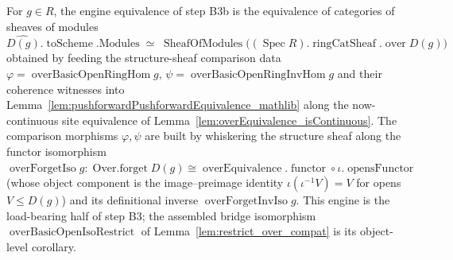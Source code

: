 \begin{definition}
  \label{def:modules_over_basicOpen_equivalence}
  For \(g \in R\), the engine equivalence of step B3b is the equivalence of categories of sheaves of
  modules
  \[
    \widehat{D(g)}.\operatorname{toScheme}.\mathrm{Modules} \;\simeq\;
    \operatorname{SheafOfModules}\bigl((\operatorname{Spec} R).\operatorname{ringCatSheaf}.\operatorname{over} D(g)\bigr)
  \]
  obtained by feeding the structure-sheaf comparison data
  \(\varphi = \operatorname{overBasicOpenRingHom} g\),
  \(\psi = \operatorname{overBasicOpenRingInvHom} g\) and their coherence witnesses into
  Lemma~\ref{lem:pushforwardPushforwardEquivalence_mathlib} along the now-continuous site equivalence
  of Lemma~\ref{lem:overEquivalence_isContinuous}. The comparison morphisms \(\varphi, \psi\) are built
  by whiskering the structure sheaf along the functor isomorphism
  \(\operatorname{overForgetIso} g : \operatorname{Over.forget} D(g) \cong
  \operatorname{overEquivalence}.\operatorname{functor} \circ \iota.\operatorname{opensFunctor}\)
  (whose object component is the image--preimage identity
  \(\iota(\iota^{-1} V) = V\) for opens \(V \le D(g)\)) and its definitional inverse
  \(\operatorname{overForgetInvIso} g\). This engine is the load-bearing half of step B3; the
  assembled bridge isomorphism \(\operatorname{overBasicOpenIsoRestrict}\) of
  Lemma~\ref{lem:restrict_over_compat} is its object-level corollary.
\end{definition}

